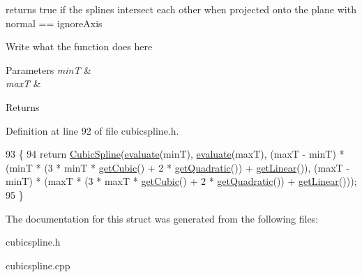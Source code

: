 returns true if the splines intersect each other when projected onto the plane with normal == ignore\+Axis 

Write what the function does here


\begin{DoxyParams}{Parameters}
{\em min\+T} & \\
\hline
{\em max\+T} & \\
\hline
\end{DoxyParams}
\begin{DoxyReturn}{Returns}

\end{DoxyReturn}


Definition at line 92 of file cubicspline.\+h.


\begin{DoxyCode}
93     \{
94         \textcolor{keywordflow}{return} \hyperlink{structCubicSpline}{CubicSpline}(\hyperlink{structCubicSpline_a6b5d7cf704ce35a9bce93d6faf53a4fe}{evaluate}(minT), \hyperlink{structCubicSpline_a6b5d7cf704ce35a9bce93d6faf53a4fe}{evaluate}(maxT), (maxT - minT) * (minT
       * (3 * minT * \hyperlink{structCubicSpline_a156525e59dae0cac2a81cf34cb673c87}{getCubic}() + 2 * \hyperlink{structCubicSpline_a7d5792ff1314032122cd342d0616a50f}{getQuadratic}()) + \hyperlink{structCubicSpline_ada872ef617b059ef68490e828bcdf181}{getLinear}()), (maxT - minT) *
       (maxT * (3 * maxT * \hyperlink{structCubicSpline_a156525e59dae0cac2a81cf34cb673c87}{getCubic}() + 2 * \hyperlink{structCubicSpline_a7d5792ff1314032122cd342d0616a50f}{getQuadratic}()) + 
      \hyperlink{structCubicSpline_ada872ef617b059ef68490e828bcdf181}{getLinear}()));
95     \}
\end{DoxyCode}


The documentation for this struct was generated from the following files\+:\begin{DoxyCompactItemize}
\item 
cubicspline.\+h\item 
cubicspline.\+cpp\end{DoxyCompactItemize}
